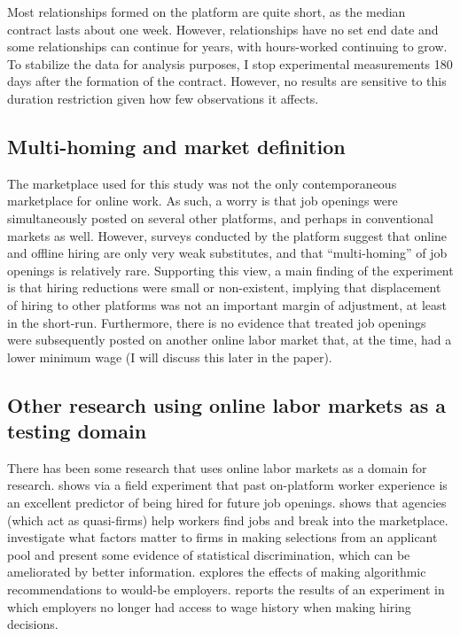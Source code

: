 \documentclass[AER]{AEA}
\begin{document}
Most relationships formed on the platform are quite short, as the median contract lasts about one week. 
However, relationships have no set end date and some relationships can continue for years, with hours-worked continuing to grow.
To stabilize the data for analysis purposes, I stop experimental measurements 180 days after the formation of the contract. 
However, no results are sensitive to this duration restriction given how few observations it affects. 

\subsection{Multi-homing and market definition}

The marketplace used for this study was not the only contemporaneous marketplace for online work. 
As such, a worry is that job openings were simultaneously posted on several other platforms, and perhaps in conventional markets as well.
However, surveys conducted by the platform suggest that online and offline hiring are only very weak substitutes, and that ``multi-homing'' of job openings is relatively rare.
Supporting this view, a main finding of the experiment is that hiring reductions were small or non-existent, implying that displacement of hiring to other platforms was not an important margin of adjustment, at least in the short-run.  
Furthermore, there is no evidence that treated job openings were subsequently posted on another online labor market that, at the time, had a lower minimum wage (I will discuss this later in the paper). 

\subsection{Other research using online labor markets as a testing domain}
There has been some research that uses online labor markets as a domain for research.
\cite{pallais2010inefficient} shows via a field experiment that past on-platform worker experience is an excellent predictor of being hired for future job openings.
\cite{stanton2011landing} shows that agencies (which act as quasi-firms) help workers find jobs and break into the marketplace.
\cite{agrawal2012online} investigate what factors matter to firms in making selections from an applicant pool and present some evidence of statistical discrimination, which can be ameliorated by better information.
\cite{horton2013effects} explores the effects of making algorithmic recommendations to would-be employers. 
\cite{barach2017} reports the results of an experiment in which employers no longer had access to wage history when making hiring decisions.  
\end{document}
